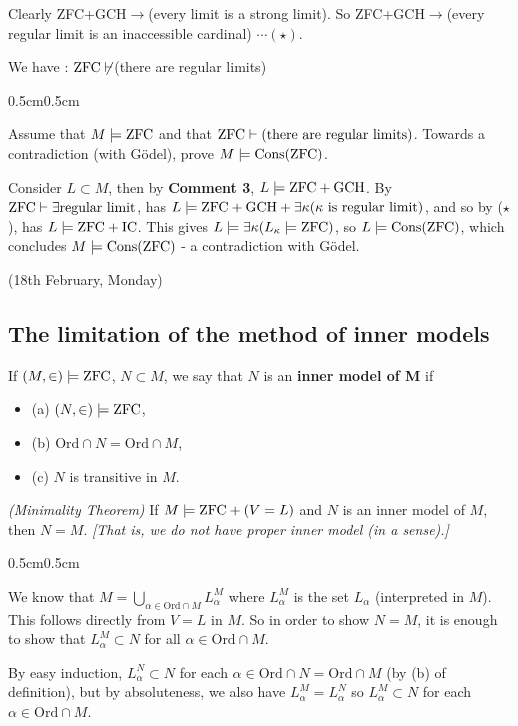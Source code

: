 \documentclass[12pt,a4paper]{article}
\newenvironment{proof}
{\begin{changemargin}{0.5cm}{0.5cm} 
	}%
	{\end{changemargin}
}
\renewenvironment{i}
{\begin{itemize} 
	}%
	{\end{itemize}
}
\newenvironment{p}
{\begin{proof} 
	}%
	{\end{proof}
}
\begin{document}
Clearly ZFC+GCH$\rightarrow$(every limit is a strong limit). So ZFC+GCH$\rightarrow$(every regular limit is an inaccessible cardinal) $\cdots (\star)$.
\s

We have : $\text{ZFC} \not\vdash$(there are regular limits)
\begin{p}
\pf Assume that $M\models \text{ZFC}$ and that $\text{ZFC} \vdash \text{(there are regular limits)}$. Towards a contradiction (with G\"odel), prove $M\models \text{Cons}(\text{ZFC})$.

\quad Consider $L\subset M$, then by \textbf{Comment 3}, $L\models \text{ZFC} + \text{GCH}$. By $\text{ZFC} \vdash \exists \text{regular limit}$, has $L \models \text{ZFC} + \text{GCH} +\exists \kappa (\kappa\text{ is regular limit})$, and so by ($\star$), has $L\models \text{ZFC} + \text{IC}$. This gives $L \models \exists \kappa (L_{\kappa} \models \text{ZFC})$, so $L\models \text{Cons}(\text{ZFC})$, which concludes $M\models \text{Cons}(\text{ZFC})$ - a contradiction with G\"odel.

\eop
\end{p}
\s

\newday

(18th February, Monday)
\s

\subsection*{The limitation of the method of inner models}

 If $(M, \in) \models \text{ZFC}$, $N\subset M$, we say that $N$ is an \textbf{inner model of M} if
\begin{i}
\item[(a)] $(N, \in) \models \text{ZFC}$,
\item[(b)] $\text{Ord} \cap N = \text{Ord} \cap M$,
\item[(c)] $N$ is transitive in $M$.
\end{i}
\s

\thm \emph{(Minimality Theorem)} If $M \models \text{ZFC} + (V=L)$ and $N$ is an inner model of $M$, then $N=M$. \emph{[That is, we do not have proper inner model (in a sense).]}
\begin{p}
\pf We know that $M = \bigcup_{\alpha \in \text{Ord} \cap M} L_{\alpha}^M$ where $L_{\alpha}^M$ is the set $L_{\alpha}$ (interpreted in $M$). This follows directly from $V=L$ in $M$. So in order to show $N = M$, it is enough to show that $L^M_{\alpha} \subset N$ for all $\alpha \in \text{Ord} \cap M$.

\quad By easy induction, $L_{\alpha}^N \subset N$ for each $\alpha \in \text{Ord} \cap N = \text{Ord} \cap M$ (by (b) of definition), but by absoluteness, we also have $L_{\alpha}^M = L_{\alpha}^N$ so $L_{\alpha}^M \subset N$ for each $\alpha \in \text{Ord} \cap M$.

\eop
\end{p}
\s
\end{document}
